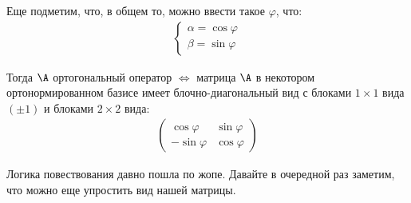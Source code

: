 \begin{enumerate}
    Еще подметим, что, в общем то, можно ввести такое $\varphi$, что:
    \begin{gather*}
        \begin{cases}
            \alpha = \cos{\varphi} \\
            \beta = \sin{\varphi}
        \end{cases} 
    \end{gather*}

    Тогда $\A$ ортогональный оператор $\Longleftrightarrow$ матрица $\A$ в 
    некотором ортонормированном базисе имеет блочно-диагональный вид с блоками $1 \times 1$ вида $(\pm 1)$ и
    блоками $2 \times 2$ вида:
    \begin{gather*}
        \left(\begin{array}{cc}
            \cos{\varphi} & \sin{\varphi} \\ 
            -\sin{\varphi} & \cos{\varphi}
        \end{array}\right)
    \end{gather*}

    Логика повествования давно пошла по жопе. Давайте в очередной раз заметим, что можно еще упростить вид нашей матрицы. 


\end{enumerate}
